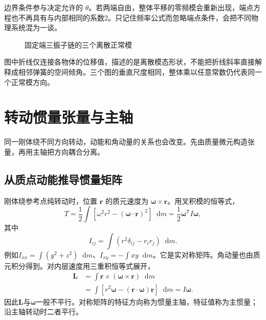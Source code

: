 \documentclass[11pt,openany,fontset=fandol]{ctexbook}
\theoremstyle{plain}\newtheorem{theorem}{定理}[chapter]\newtheorem{proposition}[theorem]{命题}
\theoremstyle{definition}\newtheorem{definition}{定义}[chapter]\newtheorem{example}{例}[chapter]
\theoremstyle{remark}\newtheorem*{remark}{说明}
\newcommand{\dd}{\mathop{}\!\mathrm d}\newcommand{\ii}{\mathrm i}\newcommand{\ee}{\mathrm e}
\newcommand{\vct}[1]{\bm{#1}}\newcommand{\Rea}{\operatorname{Re}}\newcommand{\Ima}{\operatorname{Im}}
\begin{document}
边界条件参与决定允许的 $\theta$。若两端自由，整体平移的零频模会重新出现，端点方程也不再具有与内部相同的系数2。只记住频率公式而忽略端点条件，会把不同物理系统混为一谈。

\begin{figure}[htbp]
\centering
{}
\caption{固定端三振子链的三个离散正常模}\label{fig:chain-modes}
\end{figure}
图中折线仅连接各物体的位移值，描述的是离散模态形状，不能把折线斜率直接解释成相邻弹簧的空间倾角。三个图的垂直尺度相同，整体乘以任意常数仍代表同一个正常模方向。

\section{转动惯量张量与主轴}
同一刚体绕不同方向转动，动能和角动量的关系也会改变。先由质量微元构造张量，再用主轴把方向耦合分离。

\subsection{从质点动能推导惯量矩阵}
刚体绕参考点纯转动时，位置 $\vct r$ 的质元速度为 $\vct\omega\times\vct r$。用叉积模的恒等式，
\[
T=\frac12\int[\omega^2r^2-(\vct\omega\cdot\vct r)^2]\dd m
=\frac12\vct\omega^{\mathsf T}I\vct\omega,
\]
其中
\begin{equation}
I_{ij}=\int(r^2\delta_{ij}-r_ir_j)\dd m.
\end{equation}
例如$I_{xx}=\int(y^2+z^2)\dd m$、$I_{xy}=-\int xy\dd m$。它是实对称矩阵。角动量也由质元积分得到。对内层速度用三重积恒等式展开，
\[
\begin{aligned}
\vct L&=\int\vct r\times(\vct\omega\times\vct r)\dd m\\
&=\int[r^2\vct\omega-(\vct r\cdot\vct\omega)\vct r]\dd m
=I\vct\omega.
\end{aligned}
\]
因此$\vct L$与$\vct\omega$一般不平行。对称矩阵的特征方向称为惯量主轴，特征值称为主惯量；沿主轴转动时二者平行。
\end{document}
